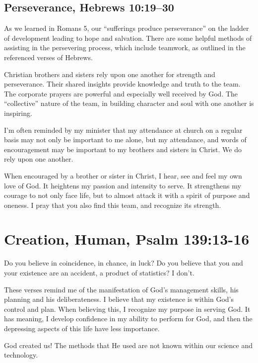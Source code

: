 \documentclass[12pt]{memoir}
\begin{document}
\subsection[Perseverance]{Perseverance, Hebrews 10:19--30}

As we learned in Romans 5, our ``sufferings produce perseverance''
on the ladder of development leading to hope and salvation. There
are some helpful methods of assisting in the persevering process,
which include teamwork, as outlined in the referenced verses of Hebrews.

Christian brothers and sisters rely upon one another for strength
and perseverance. Their shared insights provide knowledge and truth
to the team. The corporate prayers are powerful and especially well
received by God. The ``collective'' nature of the team, in building
character and soul with one another is inspiring.

I'm often reminded by my minister that my attendance at church on
a regular basis may not only be important to me alone, but my attendance,
and words of encouragement may be important to my brothers and sisters
in Christ. We do rely upon one another.

When encouraged by a brother or sister in Christ, I hear, see and
feel my own love of God. It heightens my passion and intensity to
serve. It strengthens my courage to not only face life, but to almost
attack it with a spirit of purpose and oneness. I pray that you also
find this team, and recognize its strength.

\section[Creation, Human]{Creation, Human, Psalm 139:13-16}

Do you believe in coincidence, in chance, in luck? Do you believe
that you and your existence are an accident, a product of statistics?
I don't.

These verses remind me of the manifestation of God's management skills,
his planning and his deliberateness. I believe that my existence is
within God's control and plan. When believing this, I recognize my
purpose in serving God. It has meaning, I develop confidence in my
ability to perform for God, and then the depressing aspects of this
life have less importance.

God created us! The methods that He used are not known within our
science and technology.
\end{document}
